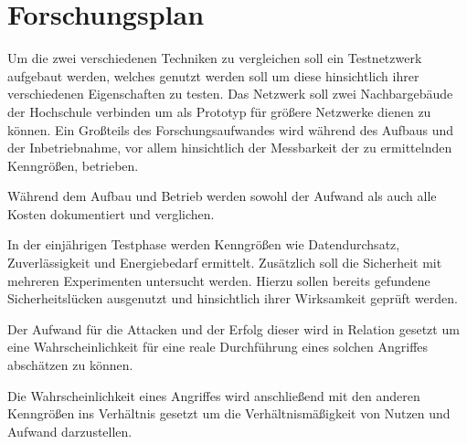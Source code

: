 \chapter{Forschungsplan}

Um die zwei verschiedenen Techniken zu vergleichen soll ein Testnetzwerk aufgebaut werden, welches genutzt werden soll um diese hinsichtlich ihrer verschiedenen Eigenschaften zu testen.
Das Netzwerk soll zwei Nachbargebäude der Hochschule verbinden um als Prototyp für größere Netzwerke dienen zu können.
Ein Großteils des Forschungsaufwandes wird während des Aufbaus und der Inbetriebnahme, vor allem hinsichtlich der Messbarkeit der zu ermittelnden Kenngrößen, betrieben.

Während dem Aufbau und Betrieb werden sowohl der Aufwand als auch alle Kosten dokumentiert und verglichen.

In der einjährigen Testphase werden Kenngrößen wie Datendurchsatz, Zuverlässigkeit und Energiebedarf ermittelt.
Zusätzlich soll die Sicherheit mit mehreren Experimenten untersucht werden.
Hierzu sollen bereits gefundene Sicherheitslücken ausgenutzt und hinsichtlich ihrer Wirksamkeit geprüft werden.

Der Aufwand für die Attacken und der Erfolg dieser wird in Relation gesetzt um eine Wahrscheinlichkeit für eine reale Durchführung eines solchen Angriffes abschätzen zu können.

Die Wahrscheinlichkeit eines Angriffes wird anschließend mit den anderen Kenngrößen ins Verhältnis gesetzt um die Verhältnismäßigkeit von Nutzen und Aufwand darzustellen.

